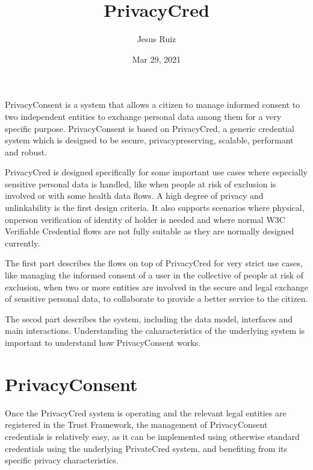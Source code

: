 \documentclass[a4paper,12pt,english,openany]{sphinxmanual}
\title{PrivacyCred}
\date{Mar 29, 2021}
\author{Jesus Ruiz}
\begin{document}
\pagestyle{empty}
\sphinxmaketitle
\pagestyle{plain}
\sphinxtableofcontents
\pagestyle{normal}
\label{\detokenize{index::doc}}


\sphinxAtStartPar
PrivacyConsent is a system that allows a citizen to manage informed consent to two
independent entities to exchange personal data among them for a very specific purpose.
PrivacyConsent is based on PrivacyCred, a generic credential system which is designed to
be secure, privacy\sphinxhyphen{}preserving, scalable, performant and robust.

\sphinxAtStartPar
PrivacyCred is designed specifically for some important use cases where especially
sensitive personal data is handled, like when people at risk of exclusion is involved or
with some health data flows. A high degree of privacy and unlinkability is the first
design criteria. It also supports scenarios where physical, on\sphinxhyphen{}person verification of
identity of holder is needed and where normal W3C Verifiable Credential flows are not
fully suitable as they are normally designed currently.

\sphinxAtStartPar
{}

\sphinxAtStartPar
The first part describes the {\hyperref[\detokenize{privacyconsent::doc}]{}} flows on top of
PrivacyCred for very strict use cases, like managing the informed consent of a user in the
collective of people at risk of exclusion, when two or more entities are involved in the
secure and legal exchange of sensitive personal data, to collaborate to provide a better
service to the citizen.

\sphinxAtStartPar
{}

\sphinxAtStartPar
The secod part describes the {\hyperref[\detokenize{privacycred::doc}]{}} system, including the data
model, interfaces and main interactions. Understanding the caharacteristics of the
underlying system is important to understand how PrivacyConsent works.


\chapter{PrivacyConsent}
\label{\detokenize{privacyconsent:privacyconsent}}\label{\detokenize{privacyconsent::doc}}
\sphinxAtStartPar
Once the PrivacyCred system is operating and the relevant legal entities are registered in the Trust Framework, the management of PrivacyConsent credentials is relatively easy, as it can be implemented using otherwise standard credentials using the underlying PrivateCred system, and benefiting from its specific privacy characteristics.
\end{document}
